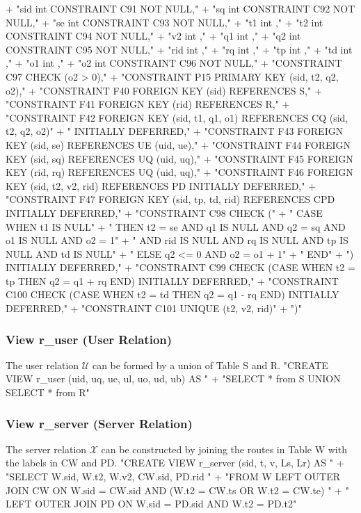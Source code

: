 \documentclass{article}
\def\nwendcode{\endtrivlist \endgroup}      %
\let\nwdocspar=\par
\theoremstyle{definition}                   %
\begin{document}
  + "sid int  CONSTRAINT C91 NOT NULL,"
  + "sq  int  CONSTRAINT C92 NOT NULL,"
  + "se  int  CONSTRAINT C93 NOT NULL,"
  + "t1  int  ,"
  + "t2  int  CONSTRAINT C94 NOT NULL,"
  + "v2  int  ,"
  + "q1  int  ,"
  + "q2  int  CONSTRAINT C95 NOT NULL,"
  + "rid int  ,"
  + "rq  int  ,"
  + "tp  int  ,"
  + "td  int  ,"
  + "o1  int  ,"
  + "o2  int  CONSTRAINT C96 NOT NULL,"
  + "CONSTRAINT C97 CHECK (o2 > 0),"
  + "CONSTRAINT P15 PRIMARY KEY (sid, t2, q2, o2),"
  + "CONSTRAINT F40 FOREIGN KEY (sid) REFERENCES S,"
  + "CONSTRAINT F41 FOREIGN KEY (rid) REFERENCES R,"
  + "CONSTRAINT F42 FOREIGN KEY (sid, t1, q1, o1) REFERENCES CQ (sid, t2, q2, o2)"
  + "  INITIALLY DEFERRED,"
  + "CONSTRAINT F43 FOREIGN KEY (sid, se) REFERENCES UE (uid, ue),"
  + "CONSTRAINT F44 FOREIGN KEY (sid, sq) REFERENCES UQ (uid, uq),"
  + "CONSTRAINT F45 FOREIGN KEY (rid, rq) REFERENCES UQ (uid, uq),"
  + "CONSTRAINT F46 FOREIGN KEY (sid, t2, v2, rid) REFERENCES PD INITIALLY DEFERRED,"
  + "CONSTRAINT F47 FOREIGN KEY (sid, tp, td, rid) REFERENCES CPD INITIALLY DEFERRED,"
  + "CONSTRAINT C98 CHECK ("
  + "  CASE WHEN t1 IS NULL"
  + "    THEN t2 = se AND q1 IS NULL AND q2 = sq AND o1 IS NULL AND o2 = 1"
  + "        AND rid IS NULL AND rq IS NULL AND tp IS NULL AND td IS NULL"
  + "    ELSE q2 <= 0 AND o2 = o1 + 1"
  + "  END"
  + ") INITIALLY DEFERRED,"
  + "CONSTRAINT  C99 CHECK (CASE WHEN t2 = tp THEN q2 = q1 + rq END) INITIALLY DEFERRED,"
  + "CONSTRAINT C100 CHECK (CASE WHEN t2 = td THEN q2 = q1 - rq END) INITIALLY DEFERRED,"
  + "CONSTRAINT C101 UNIQUE (t2, v2, rid)"
  + ")"
\nwendcode{}\nwdocspar

\subsubsection{View r\_user (User Relation)}
The user relation $\mathcal{U}$ can be formed by a union of Table S and R.
\nwenddocs{}\endmoddef{}
"CREATE VIEW r_user (uid, uq, ue, ul, uo, ud, ub) AS "
  + "SELECT * from S UNION SELECT * from R"
\nwendcode{}\nwdocspar

\subsubsection{View r\_server (Server Relation)}
The server relation $\mathcal{X}$ can be constructed by joining the routes in
Table W with the labels in CW and PD.
\nwenddocs{}\endmoddef{}
"CREATE VIEW r_server (sid, t, v, Ls, Lr) AS "
  + "SELECT W.sid, W.t2, W.v2, CW.sid, PD.rid "
  + "FROM W LEFT OUTER JOIN CW ON W.sid = CW.sid AND (W.t2 = CW.ts OR W.t2 = CW.te) "
  + "  LEFT OUTER JOIN PD ON W.sid = PD.sid AND W.t2 = PD.t2"
\nwendcode{}\nwdocspar
\end{document}
